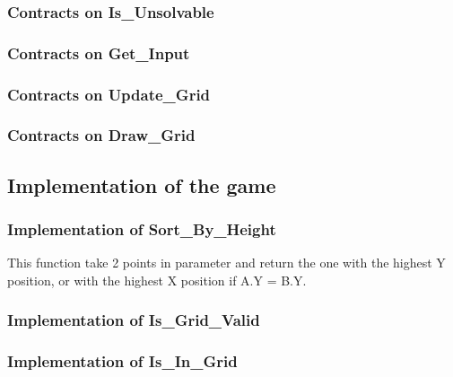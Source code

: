 \subsubsection{Contracts on Is\_Unsolvable}


\subsubsection{Contracts on Get\_Input}


\newpage

\subsubsection{Contracts on Update\_Grid}


\subsubsection{Contracts on Draw\_Grid}


\newpage

\subsection{Implementation of the game}

\subsubsection{Implementation of Sort\_By\_Height}

\noindent
This function take 2 points in parameter and return the one with the highest Y
position, or with the highest X position if A.Y = B.Y.


\subsubsection{Implementation of Is\_Grid\_Valid}


\subsubsection{Implementation of Is\_In\_Grid}


